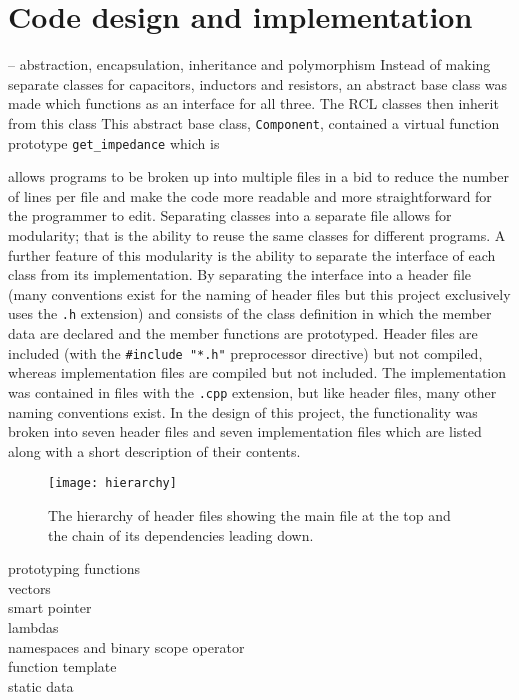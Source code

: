 \section{Code design and implementation}
\label{sec:code}
\CC{} -- abstraction, encapsulation, inheritance and polymorphism
Instead of making separate classes for capacitors, inductors and resistors, an abstract base class was made which functions as an interface for all three. The RCL classes then inherit from this class This abstract base class, \verb!Component!, contained a virtual function prototype \verb!get_impedance! which is


\CC{} allows programs to be broken up into multiple files in a bid to reduce the number of lines per file and make the code more readable and more straightforward for the programmer to edit. Separating classes into a separate file allows for modularity; that is the ability to reuse the same classes for different programs.
A further feature of this modularity is the ability to separate the interface of each class from its implementation. By separating the interface into a header file (many conventions exist for the naming of \CC{} header files but this project exclusively uses the \verb!.h! extension) and consists of the class definition in which the member data are declared and the member functions are prototyped. Header files are included (with the \verb!#include "*.h"! preprocessor directive) but not compiled, whereas implementation files are compiled but not included. The implementation was contained in files with the \verb!.cpp! extension, but like header files, many other naming conventions exist.
In the design of this project, the functionality was broken into seven header files and seven implementation files which are listed along with a short description of their contents.

\begin{figure}
  \begin{center}
    \texttt{[image: hierarchy]}
  \end{center}
  \caption{The hierarchy of header files showing the main file at the top and the chain of its dependencies leading down.}
  \label{fig:hierarchy}
\end{figure}









prototyping functions\\

vectors\\
smart pointer\\
lambdas\\
namespaces and binary scope operator\\
function template\\
static data\\
